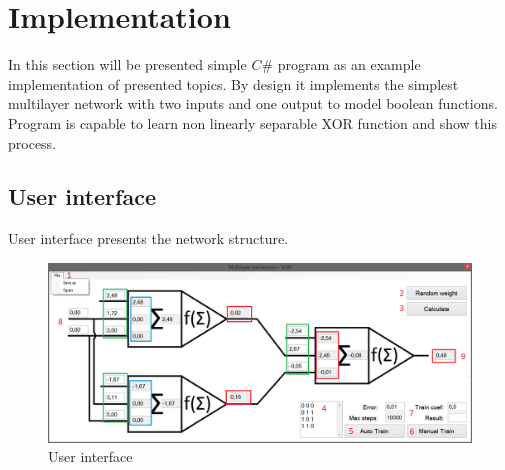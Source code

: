 \section{Implementation}

In this section will be presented simple $C\#$ program as an example implementation of presented topics.
By design it implements the simplest multilayer network with two inputs and one output to model boolean functions.
Program is capable to learn non linearly separable XOR function and show this process.

\subsection{User interface}

User interface presents the network structure.

\begin{figure}[!h]
    \centering
    \includegraphics[scale=0.45]{Media/UI_numbers.png}
    \caption{User interface}
    \label{fig:UI}
\end{figure}

